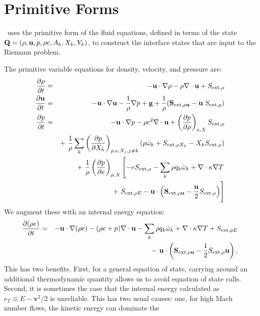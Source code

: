 \section{Primitive Forms}
\castro\ uses the primitive form of the fluid equations, defined in terms of
the state ${\bf Q} = (\rho, {\bf u}, p, \rho e, A_k, X_k, Y_k)$, to construct the
interface states that are input to the Riemann problem.

The primitive variable equations for density, velocity, and pressure are:
\begin{eqnarray}
  \frac{\partial\rho}{\partial t} &=& -\ub\cdot\nabla\rho - \rho\nabla\cdot\ub + S_{{\rm ext},\rho} \\
%
  \frac{\partial\ub}{\partial t} &=& -\ub\cdot\nabla\ub - \frac{1}{\rho}\nabla p + \gb + 
\frac{1}{\rho} (\Sb_{{\rm ext},\rho\ub} - \ub \; S_{{\rm ext},\rho}) \\
\frac{\partial p}{\partial t} &=& -\ub\cdot\nabla p - \rho c^2\nabla\cdot\ub +
\left(\frac{\partial p}{\partial \rho}\right)_{e,X}S_{{\rm ext},\rho}\nonumber\\
&&+\  \frac{1}{\rho}\sum_k\left(\frac{\partial p}{\partial X_k}\right)_{\rho,e,X_j,j\neq k}\left(\rho\dot\omega_k + S_{{\rm ext},\rho X_k} - X_kS_{{\rm ext},\rho}\right)\nonumber\\
&& +\  \frac{1}{\rho}\left(\frac{\partial p}{\partial e}\right)_{\rho,X}\left[-eS_{{\rm ext},\rho} - \sum_k\rho q_k\dot\omega_k + \nabla\cdot\kappa\nabla T \right.\nonumber\\
&& \quad\qquad\qquad\qquad+\ S_{{\rm ext},\rho E} - \ub\cdot\left(\Sb_{{\rm ext},\rho\ub} - \frac{\ub}{2}S_{{\rm ext},\rho}\right)\Biggr] 
\end{eqnarray}
We augment these with an internal energy equation:
\begin{eqnarray}
\frac{\partial(\rho e)}{\partial t} &=& - {\bf u}\cdot\nabla(\rho e) - (\rho e+p)\nabla\cdot{\bf u} - \sum_k \rho q_k\dot\omega_k 
                                        + \nabla\cdot\kappa\nabla T + S_{{\rm ext},\rho E} \nonumber\\
&& -\  {\bf u}\cdot\left({\bf S}_{{\rm ext},\rho{\bf u}}-\frac{1}{2}S_{{\rm ext},\rho}{\bf u}\right), 
\end{eqnarray}
This has two benefits. First, for a general equation of state, carrying around an additional
thermodynamic quantity allows us to avoid equation of state calls. Second, it is sometimes
the case that the internal energy calculated as $e_T \equiv E - \mathbf{v}^2 / 2$ is unreliable.
This has two usual causes: one, for high Mach number flows, the kinetic energy can dominate the

